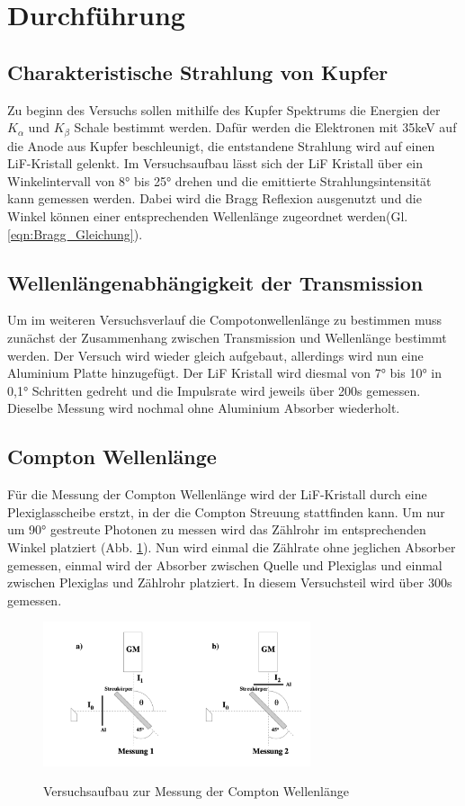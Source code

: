 \section{Durchführung}
\label{sec:Durchfuehrung}
\subsection{Charakteristische Strahlung von Kupfer}
Zu beginn des Versuchs sollen mithilfe des Kupfer Spektrums die Energien der $K_{\alpha}$ und $K_{\beta}$ Schale bestimmt werden.
Dafür werden die Elektronen mit 35keV auf die Anode aus Kupfer beschleunigt, die entstandene Strahlung wird auf einen LiF-Kristall gelenkt.
Im Versuchsaufbau lässt sich der LiF Kristall über ein Winkelintervall von 8° bis 25° drehen und die emittierte Strahlungsintensität kann gemessen werden.
Dabei wird die Bragg Reflexion ausgenutzt und die Winkel können einer entsprechenden Wellenlänge zugeordnet werden(Gl. \ref{eqn:Bragg_Gleichung}).

\subsection{Wellenlängenabhängigkeit der Transmission}
Um im weiteren Versuchsverlauf die Compotonwellenlänge zu bestimmen muss zunächst der Zusammenhang zwischen Transmission und Wellenlänge bestimmt werden.
Der Versuch wird wieder gleich aufgebaut, allerdings wird nun eine Aluminium Platte hinzugefügt.
Der LiF Kristall wird diesmal von 7° bis 10° in 0,1° Schritten gedreht und die Impulsrate wird jeweils über 200s gemessen.
Dieselbe Messung wird nochmal ohne Aluminium Absorber wiederholt.

\subsection{Compton Wellenlänge}
Für die Messung der Compton Wellenlänge wird der LiF-Kristall durch eine Plexiglasscheibe erstzt, in der die Compton Streuung stattfinden kann. Um nur um 90° gestreute Photonen zu messen wird das Zählrohr im entsprechenden Winkel platziert (Abb. \ref{fig:Versuchsaufbau_2}).
Nun wird einmal die Zählrate ohne jeglichen Absorber gemessen, einmal wird der Absorber zwischen Quelle und Plexiglas und einmal zwischen Plexiglas und Zählrohr platziert.
In diesem Versuchsteil wird über 300s gemessen.
\begin{figure}
    \centering
    \includegraphics[width=0.7\textwidth]{bilder/Exp_Aufbau_2.png}
    \label{fig:Versuchsaufbau_2}
    \caption{Versuchsaufbau zur Messung der Compton Wellenlänge}
\end{figure}
